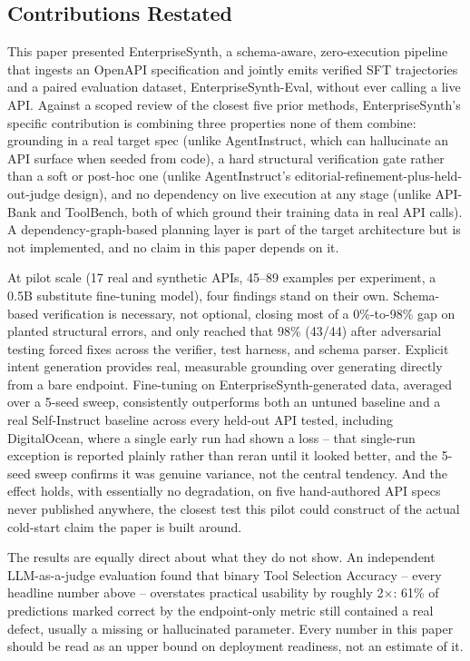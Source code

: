 \documentclass[11pt]{article}
\begin{document}
\subsection{Contributions Restated}
This paper presented EnterpriseSynth, a schema-aware, zero-execution pipeline that ingests an
OpenAPI specification and jointly emits verified SFT trajectories and a paired evaluation dataset,
EnterpriseSynth-Eval, without ever calling a live API. Against a scoped review of the closest five
prior methods, EnterpriseSynth's specific contribution is combining three properties none of them
combine: grounding in a real target spec (unlike AgentInstruct, which can hallucinate an API
surface when seeded from code), a hard structural verification gate rather than a soft or
post-hoc one (unlike AgentInstruct's editorial-refinement-plus-held-out-judge design), and no
dependency on live execution at any stage (unlike API-Bank and ToolBench, both of which ground
their training data in real API calls). A dependency-graph-based planning layer is part of the
target architecture but is not implemented, and no claim in this paper depends on it.

At pilot scale (17 real and synthetic APIs, 45--89 examples per experiment, a 0.5B substitute
fine-tuning model), four findings stand on their own. Schema-based verification is necessary, not
optional, closing most of a 0\%-to-98\% gap on planted structural errors, and only reached that
98\% (43/44) after adversarial testing forced fixes across the verifier, test harness, and schema
parser. Explicit intent generation provides real, measurable grounding over generating directly
from a bare
endpoint. Fine-tuning on EnterpriseSynth-generated data, averaged over a 5-seed sweep, consistently
outperforms both an untuned baseline and a real Self-Instruct baseline across every held-out API
tested, including DigitalOcean, where a single early run had shown a loss -- that single-run
exception is reported plainly rather than reran until it looked better, and the 5-seed sweep
confirms it was genuine variance, not the central tendency. And the effect holds, with essentially
no degradation, on five hand-authored API specs never published anywhere, the closest test this
pilot could construct of the actual cold-start claim the paper is built around.

The results are equally direct about what they do not show. An independent LLM-as-a-judge
evaluation found that binary Tool Selection Accuracy -- every headline number above -- overstates
practical usability by roughly 2$\times$: 61\% of predictions marked correct by the endpoint-only
metric still contained a real defect, usually a missing or hallucinated parameter. Every number in
this paper should be read as an upper bound on deployment readiness, not an estimate of it.
\end{document}
